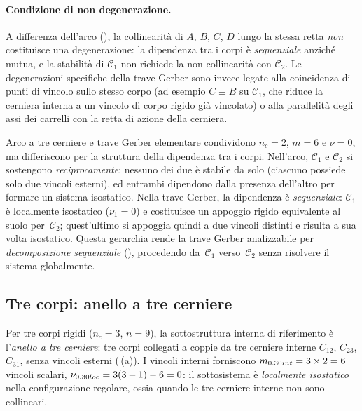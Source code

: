\paragraph{Condizione di non degenerazione.}
A differenza dell'arco (), la collinearità
di $A$, $B$, $C$, $D$ lungo la stessa retta \emph{non} costituisce
una degenerazione: la dipendenza tra i corpi è \emph{sequenziale}
anziché mutua, e la stabilità di $\mathcal{C}_1$ non richiede la
non collinearità con $\mathcal{C}_2$.
Le degenerazioni specifiche della trave Gerber sono invece legate
alla coincidenza di punti di vincolo sullo stesso corpo (ad esempio
$C \equiv B$ su $\mathcal{C}_1$, che riduce la cerniera interna a un
vincolo di corpo rigido già vincolato) o alla parallelità degli assi
dei carrelli con la retta di azione della cerniera.

\begin{oss}
    Arco a tre cerniere e trave Gerber elementare condividono
    $n_c = 2$, $m = 6$ e $\nu = 0$, ma differiscono per la struttura
    della dipendenza tra i corpi.
    Nell'arco, $\mathcal{C}_1$ e $\mathcal{C}_2$ si sostengono
    \emph{reciprocamente}: nessuno dei due è stabile da solo
    (ciascuno possiede solo due vincoli esterni), ed entrambi
    dipendono dalla presenza dell'altro per formare un sistema isostatico.
    Nella trave Gerber, la dipendenza è \emph{sequenziale}:
    $\mathcal{C}_1$ è localmente isostatico ($\nu_1 = 0$) e
    costituisce un appoggio rigido equivalente al suolo per~$\mathcal{C}_2$;
    quest'ultimo si appoggia quindi a due vincoli distinti e
    risulta a sua volta isostatico.
    Questa gerarchia rende la trave Gerber analizzabile per
    \emph{decomposizione sequenziale} (),
    procedendo da~$\mathcal{C}_1$ verso~$\mathcal{C}_2$ senza
    risolvere il sistema globalmente.
\end{oss}


\subsection{Tre corpi: anello a tre cerniere}
\label{sec:catalogo_3corpi}

Per tre corpi rigidi ($n_c = 3$, $n = 9$), la sottostruttura
interna di riferimento è l'\emph{anello a tre cerniere}: tre
corpi collegati a coppie da tre cerniere interne $C_{12}$,
$C_{23}$, $C_{31}$, senza vincoli esterni
(\,(a)). I vincoli interni
forniscono $m_{\rm int} = 3 \times 2 = 6$ vincoli scalari,
$\nu_{\rm loc} = 3(3-1) - 6 = 0$: il sottosistema è
\emph{localmente isostatico} nella configurazione regolare,
ossia quando le tre cerniere interne non sono collineari.


